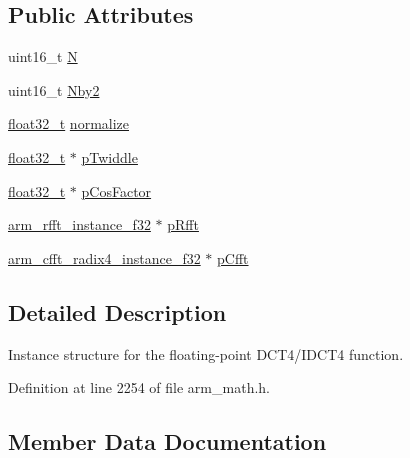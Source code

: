 \subsection*{Public Attributes}
\begin{DoxyCompactItemize}
\item 
uint16\+\_\+t \hyperlink{structarm__dct4__instance__f32_a262b29a51c371b46efc89120e31ccf37}{N}
\item 
uint16\+\_\+t \hyperlink{structarm__dct4__instance__f32_adb1ef2739ddbe62e5cdadc47455a4147}{Nby2}
\item 
\hyperlink{arm__math_8h_a4611b605e45ab401f02cab15c5e38715}{float32\+\_\+t} \hyperlink{structarm__dct4__instance__f32_a61ce8c967b2e998a9c0041cca73cdef8}{normalize}
\item 
\hyperlink{arm__math_8h_a4611b605e45ab401f02cab15c5e38715}{float32\+\_\+t} $\ast$ \hyperlink{structarm__dct4__instance__f32_ad13544aafad268588c62e3eb35ae662c}{p\+Twiddle}
\item 
\hyperlink{arm__math_8h_a4611b605e45ab401f02cab15c5e38715}{float32\+\_\+t} $\ast$ \hyperlink{structarm__dct4__instance__f32_a6da1187e070801e011ce5e0582efa861}{p\+Cos\+Factor}
\item 
\hyperlink{structarm__rfft__instance__f32}{arm\+\_\+rfft\+\_\+instance\+\_\+f32} $\ast$ \hyperlink{structarm__dct4__instance__f32_a978f37fc19add31af243ab5c63ae502f}{p\+Rfft}
\item 
\hyperlink{structarm__cfft__radix4__instance__f32}{arm\+\_\+cfft\+\_\+radix4\+\_\+instance\+\_\+f32} $\ast$ \hyperlink{structarm__dct4__instance__f32_a018f7860b6e070af533fb7d76c7cdc32}{p\+Cfft}
\end{DoxyCompactItemize}


\subsection{Detailed Description}
Instance structure for the floating-\/point D\+C\+T4/\+I\+D\+C\+T4 function. 

Definition at line 2254 of file arm\+\_\+math.\+h.



\subsection{Member Data Documentation}
\mbox{\label{structarm__dct4__instance__f32_a262b29a51c371b46efc89120e31ccf37}} 
